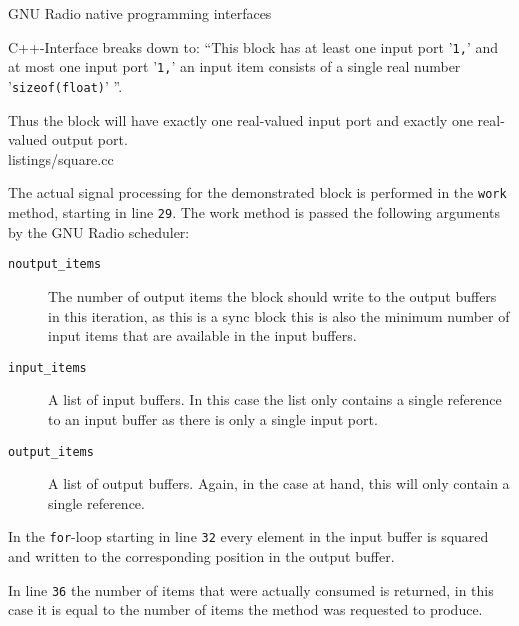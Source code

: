 \begin{subchapter}{GNU Radio native programming interfaces}
\begin{subsubchapter}{C++-Interface}
    breaks down to: ``This block has at least one input port '\texttt{1,}' and
    at most one input port '\texttt{1,}' an input item consists of a single real
    number '\texttt{sizeof(float)}' ''.

    Thus the block will have exactly one real-valued input port and exactly
    one real-valued output port. \\

    
                    {listings/square.cc}

    The actual signal processing for the demonstrated block
    is performed in the \texttt{work} method, starting in line
    \texttt{29}. The work method is passed the following arguments
    by the GNU Radio scheduler:

    \begin{description}
      \item[\texttt{noutput\_items}]
        The number of output items the block should write to the output
        buffers in this iteration, as this is a sync block this is also
        the minimum number of input items that are available in the input buffers.

      \item[\texttt{input\_items}]
        A list of input buffers. In this case the list only contains
        a single reference to an input buffer as there is only a
        single input port.

      \item[\texttt{output\_items}]
        A list of output buffers. Again, in the case at hand,
        this will only contain a single reference.
    \end{description}
  \end{subsubchapter}

  In the \texttt{for}-loop starting in line \texttt{32}
  every element in the input buffer is squared and written to
  the corresponding position in the output buffer.

  In line \texttt{36} the number of items that were actually consumed
  is returned, in this case it is equal to the number of items
  the method was requested to produce.
\end{subchapter}
